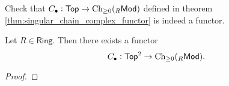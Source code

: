 \begin{exercise}
	Check that $C_\bullet : \mathsf{Top} \to \operatorname{Ch}_{\geq 0}({_R}\mathsf{Mod})$ defined in theorem \ref{thm:singular_chain_complex_functor} is indeed a functor.
\end{exercise}

\begin{theorem}
	\label{thm:relative_singular_chain_complex_functor}
	Let $R \in \mathsf{Ring}$. Then there exists a functor 
	\begin{equation*}
		C_\bullet : \mathsf{Top}^2 \to \operatorname{Ch}_{\geq 0}({_R}\mathsf{Mod}).
	\end{equation*}
\end{theorem}

\begin{proof}
	
\end{proof}
